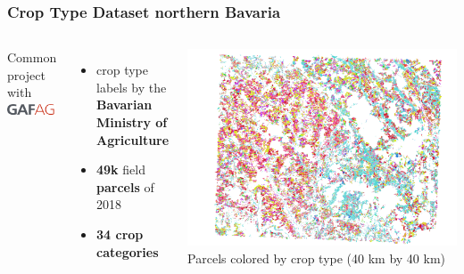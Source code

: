 

\begin{frame}
	\frametitle{Crop Type Dataset northern Bavaria}
	
	\begin{columns}
		\Large
		Common project with \includegraphics[height=5mm]{images/GAF_logo}
		
		\vspace{1em}
		\begin{itemize}
			\item crop type labels by the \\ \textbf{Bavarian Ministry of Agriculture}
			\item \textbf{49k} field \textbf{parcels} of 2018
			\item \textbf{34 crop categories}
		\end{itemize}
		\includegraphics[width=\textwidth]{images/holl}
		\small
		Parcels colored by crop type (40 km by 40 km)
		
	\end{columns}
	
\end{frame}

